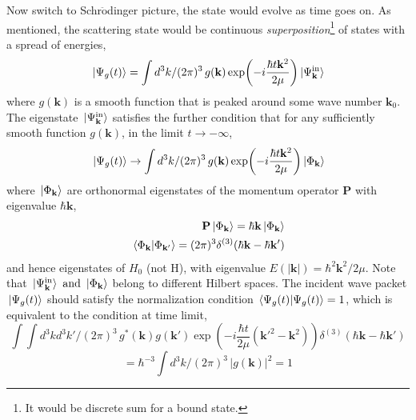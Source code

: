 \documentclass[12pt]{article}
\numberwithin{equation}{section}
\begin{document}
Now switch to Schr$\ddot{\text{o}}$dinger picture, the state would evolve as time goes on.
As mentioned, the scattering state would be continuous \textit{superposition}\footnote{It would be discrete sum for a bound state.} of states with a spread of energies,
\begin{equation}
    \ket*{\Psi_{g}(t)} = \int{d^{3}k/(2\pi)^3\,g(\mathbf{k})\exp(-i\frac{\hbar t\mathbf{k}^2}{2\mu})\ket*{\Psi_{\mathbf{k}}^{\text{in}}}}
\end{equation}
where $g(\mathbf{k})$ is a smooth function that is peaked around some wave number $\mathbf{k}_0$.
The eigenstate $\ket*{\Psi_{\mathbf{k}}^{\text{in}}}$ satisfies the further condition that for any sufficiently smooth  function $g(\mathbf{k})$, in the limit $t\rightarrow-\infty$,
\begin{equation}
    \ket*{\Psi_{g}(t)}\rightarrow\int{d^3k/(2\pi)^3\,g(\mathbf{k})\exp(-i\frac{\hbar t\mathbf{k}^2}{2\mu})\ket*{\Phi_{\mathbf{k}}}}
\end{equation}
where $\ket*{\Phi_{\mathbf{k}}}$ are orthonormal eigenstates of the momentum operator $\mathbf{P}$ with eigenvalue $\hbar\mathbf{k}$,
\begin{equation}
    \begin{split}
        \mathbf{P}\ket*{\Phi_{\mathbf{k}}} = \hbar\mathbf{k}\ket*{\Phi_{\mathbf{k}}}\\
        \braket*{\Phi_{\mathbf{k}}}{\Phi_{\mathbf{k}'}} = (2\pi)^3\delta^{(3)}(\hbar\mathbf{k} - \hbar\mathbf{k}')
    \end{split}
\end{equation}
and hence eigenstates of $H_0$ (not H), with eigenvalue $E(|\mathbf{k}|) = \hbar^2\mathbf{k}^2/2\mu$. 
Note that $\ket*{\Psi_{\mathbf{k}}^{\text{in}}}\text{ and } \ket*{\Phi_{\mathbf{k}}}$ belong to different Hilbert spaces.
The incident wave packet $\ket*{\Psi_{g}(t)}$ should satisfy the normalization condition $\braket*{\Psi_{g}(t)}{\Psi_{g}(t)} = 1$, which is equivalent to the condition at time limit,
\[\int\int{d^3kd^{3}k'/(2\pi)^3\,g^{*}(\mathbf{k})g(\mathbf{k}')\exp(-i\frac{\hbar t}{2\mu}(\mathbf{k}'^2-\mathbf{k}^2))\delta^{(3)}(\hbar\mathbf{k} - \hbar\mathbf{k}')}\]
\begin{equation}
    = \hbar^{-3}\int{d^3k/(2\pi)^3\,|g(\mathbf{k})|^2} = 1
\end{equation}
\end{document}
